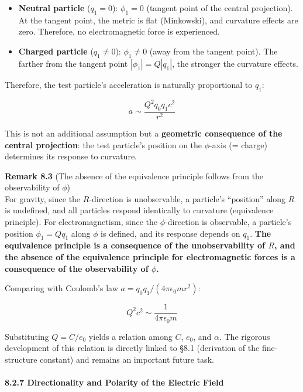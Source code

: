 \documentclass[a4paper,11pt]{article}
\theoremstyle{definition}
\begin{document}
\begin{itemize}
\tightlist
\item
  \textbf{Neutral particle} (\(q_1 = 0\)): \(\phi_1 = 0\) (tangent point of the central projection). At the tangent point, the metric is flat (Minkowski), and curvature effects are zero. Therefore, no electromagnetic force is experienced.
\item
  \textbf{Charged particle} (\(q_1 \neq 0\)): \(\phi_1 \neq 0\) (away from the tangent point). The farther from the tangent point \(|\phi_1| = Q|q_1|\), the stronger the curvature effects.
\end{itemize}

Therefore, the test particle's acceleration is naturally proportional to \(q_1\):

\[a \sim \frac{Q^2 q_0 q_1 c^2}{r^2} \tag{8.9}\]

This is not an additional assumption but a \textbf{geometric consequence of the central projection}: the test particle's position on the \(\phi\)-axis (= charge) determines its response to curvature.

\textbf{Remark 8.3} (The absence of the equivalence principle follows from the observability of \(\phi\))\\
For gravity, since the \(R\)-direction is unobservable, a particle's ``position'' along \(R\) is undefined, and all particles respond identically to curvature (equivalence principle). For electromagnetism, since the \(\phi\)-direction is observable, a particle's position \(\phi_1 = Qq_1\) along \(\phi\) is defined, and its response depends on \(q_1\). \textbf{The equivalence principle is a consequence of the unobservability of \(R\), and the absence of the equivalence principle for electromagnetic forces is a consequence of the observability of \(\phi\).}

Comparing with Coulomb's law \(a = q_0 q_1 / (4\pi\epsilon_0 m r^2)\):

\[Q^2 c^2 \sim \frac{1}{4\pi\epsilon_0 m} \tag{8.10}\]

Substituting \(Q = C/e_0\) yields a relation among \(C\), \(e_0\), and \(\alpha\). The rigorous development of this relation is directly linked to §8.1 (derivation of the fine-structure constant) and remains an important future task.

\paragraph{8.2.7 Directionality and Polarity of the Electric Field}\label{directionality-and-polarity-of-the-electric-field}
\end{document}

